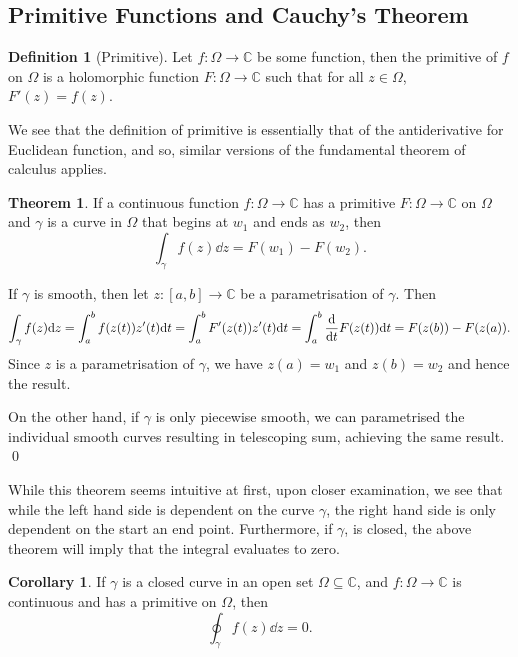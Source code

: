 \documentclass[
]{article}
\theoremstyle{definition}
\newtheorem{theorem}{Theorem}
\newtheorem{corollary}{Corollary}[theorem]
\theoremstyle{definition}
\newtheorem{definition}{Definition}[section]
\begin{document}
\hypertarget{primitive-functions-and-cauchys-theorem}{%
\subsection{Primitive Functions and Cauchy's
Theorem}\label{primitive-functions-and-cauchys-theorem}}

\begin{definition}[Primitive]
  Let \(f : \Omega \to \mathbb{C}\) be some function, then the primitive of \(f\) 
  on \(\Omega\) is a holomorphic function \(F : \Omega \to \mathbb{C}\) such that 
  for all \(z \in \Omega\), \(F'(z) = f(z)\).
\end{definition}

We see that the definition of primitive is essentially that of the
antiderivative for Euclidean function, and so, similar versions of the
fundamental theorem of calculus applies.

\begin{theorem}
  If a continuous function \(f : \Omega \to \mathbb{C}\) has a primitive 
  \(F : \Omega \to \mathbb{C}\) on \(\Omega\) and \(\gamma\) is a curve in 
  \(\Omega\) that begins at \(w_1\) and ends as \(w_2\), then 
  \[\int_\gamma f(z) \dd z = F(w_1) - F(w_2).\]
\end{theorem}
\proof

If \(\gamma\) is smooth, then let \(z : [a, b] \to \mathbb{C}\) be a
parametrisation of \(\gamma\). Then
\[\int_\gamma f(z) \dd z = \int_a^b f(z(t)) z'(t) \dd t = \int_a^b F'(z(t)) z'(t) \dd t
    = \int_a^b \dv{t} F(z(t)) \dd t = F(z(b)) - F(z(a)).\] Since \(z\)
is a parametrisation of \(\gamma\), we have \(z(a) = w_1\) and
\(z(b) = w_2\) and hence the result.

On the other hand, if \(\gamma\) is only piecewise smooth, we can
parametrised the individual smooth curves resulting in telescoping sum,
achieving the same result. \qed

While this theorem seems intuitive at first, upon closer examination, we
see that while the left hand side is dependent on the curve \(\gamma\),
the right hand side is only dependent on the start an end point.
Furthermore, if \(\gamma\), is closed, the above theorem will imply that
the integral evaluates to zero.

\begin{corollary}
  If \(\gamma\) is a closed curve in an open set \(\Omega \subseteq \mathbb{C}\), 
  and \(f : \Omega \to \mathbb{C}\) is continuous and has a primitive on \(\Omega\),
  then
  \[\oint_\gamma f(z) \dd z = 0.\]
\end{corollary}
\end{document}
